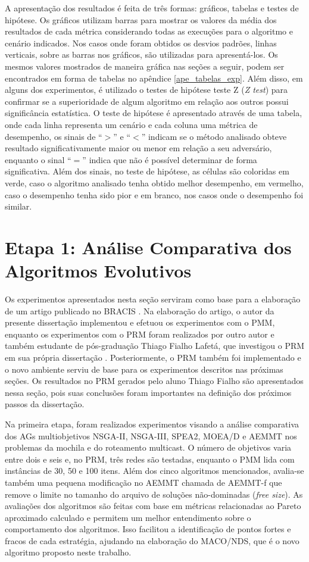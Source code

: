A apresentação dos resultados é feita de três formas: gráficos, tabelas e testes de hipótese. Os gráficos utilizam barras para mostrar os valores da média dos resultados de cada métrica considerando todas as execuções para o algoritmo e cenário indicados. Nos casos onde foram obtidos os desvios padrões, linhas verticais, sobre as barras nos gráficos, são utilizadas para apresentá-los. Os mesmos valores mostrados de maneira gráfica nas seções a seguir, podem ser encontrados em forma de tabelas no apêndice \ref{ape_tabelas_exp}. Além disso, em alguns dos experimentos, é utilizado o testes de hipótese teste Z (\textit{Z test}) para confirmar se a superioridade de algum algoritmo em relação aos outros possui significância estatística. O teste de hipótese é apresentado através de uma tabela, onde cada linha representa um cenário e cada coluna uma métrica de desempenho, os sinais de ``$>$'' e ``$<$'' indicam se o método analisado obteve resultado significativamente maior ou menor em relação a seu adversário, enquanto o sinal ``$=$'' indica que não é possível determinar de forma significativa. Além dos sinais, no teste de hipótese, as células são coloridas em verde, caso o algoritmo analisado tenha obtido melhor desempenho, em vermelho, caso o desempenho tenha sido pior e em branco, nos casos onde o desempenho foi similar.

\section{Etapa 1: Análise Comparativa dos Algoritmos Evolutivos}
\label{section_experimentos_etapa1}

Os experimentos apresentados nesta seção serviram como base para a elaboração de um artigo publicado no \ac{BRACIS} \cite{Franca2017}. Na elaboração do artigo, o autor da presente dissertação implementou e efetuou os experimentos com o PMM, enquanto os experimentos com o PRM foram realizados por outro autor e também estudante de pós-graduação Thiago Fialho Lafetá, que investigou o PRM em sua própria dissertação \cite{LafetaThesis}. Posteriormente, o PRM também foi implementado e o novo ambiente serviu de base para os experimentos descritos nas próximas seções. Os resultados no PRM gerados pelo aluno Thiago Fialho são apresentados nessa seção, pois suas conclusões foram importantes na definição dos próximos passos da dissertação.

Na primeira etapa, foram realizados experimentos visando a análise comparativa dos AGs multiobjetivos NSGA-II, NSGA-III, SPEA2, MOEA/D e AEMMT nos problemas da mochila e do roteamento multicast. O número de objetivos varia entre dois e seis e, no PRM, três redes são testadas, enquanto o PMM lida com instâncias de 30, 50 e 100 itens. Além dos cinco algoritmos mencionados, avalia-se também uma pequena modificação no AEMMT chamada de AEMMT-f que remove o limite no tamanho do arquivo de soluções não-dominadas (\textit{free size}). As avaliações dos algoritmos são feitas com base em métricas relacionadas ao Pareto aproximado calculado e permitem um melhor entendimento sobre o comportamento dos algoritmos. Isso facilitou a identificação de pontos fortes e fracos de cada estratégia, ajudando na elaboração do MACO/NDS, que é o novo algoritmo proposto neste trabalho.

